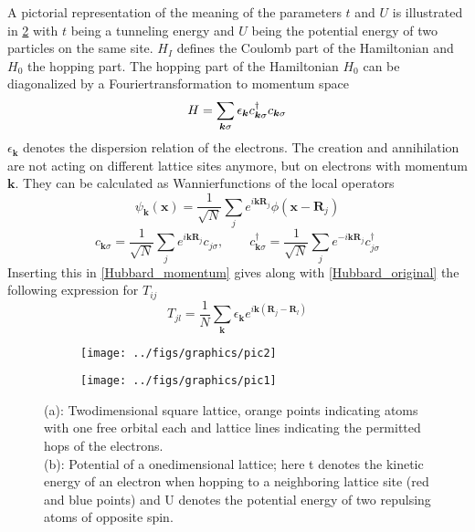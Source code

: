 A pictorial representation of the meaning of the parameters $ t $ and $ U $ is illustrated in \ref{fig:pic1} with $t$ being a tunneling energy and $U$ being the potential energy of two particles on the same site. 
$ H_I $ defines the Coulomb part of the Hamiltonian and $H_0$ the hopping part.
The hopping part of the Hamiltonian $H_0$ can be diagonalized by a Fouriertransformation to momentum space \cite{schoett2014}
\begin{equation}\label{Hubbard_momentum}
H = \sum_{\boldsymbol{k} \sigma} \epsilon_{\boldsymbol{k}} c_{\boldsymbol{k}\sigma}^\dag c_{\boldsymbol{k}\sigma}\\
\end{equation}
$ \epsilon_{\boldsymbol{k}} $ denotes the dispersion relation of the electrons. The creation and annihilation are not acting on different lattice sites anymore, but on electrons with momentum $ \boldsymbol{k} $. They can be calculated as Wannierfunctions of the local operators
\begin{equation}\label{Wannier}
\psi_{\boldsymbol{k}} \left( \boldsymbol{x}\right) = \frac{1}{\sqrt{N}}\sum_{j} e^{i\boldsymbol{k}\boldsymbol{R}_j} \phi(\boldsymbol{x}-\boldsymbol{R}_j)
\end{equation} 
\begin{equation}\label{c_momentum}
c_{\boldsymbol{k}\sigma} = \frac{1}{\sqrt{N}}\sum_{j} e^{i\boldsymbol{k}\boldsymbol{R}_j} c_{j\sigma}, \qquad c_{\boldsymbol{k}\sigma}^\dagger = \frac{1}{\sqrt{N}}\sum_{j} e^{-i\boldsymbol{k}\boldsymbol{R}_j} c_{j\sigma}^\dagger
\end{equation}\cite{Hubbard}  
Inserting this in \eqref{Hubbard_momentum} gives along with \eqref{Hubbard_original} the following expression for $ T_{ij} $ 
\begin{equation}\label{T}
T_{jl} = \frac{1}{N} \sum_{\boldsymbol{k}}\epsilon_{\boldsymbol{k}} e^{i\boldsymbol{k}\left( \boldsymbol{R}_j - \boldsymbol{R}_l\right) }
\end{equation}

\begin{figure}[h!]
	\begin{subfigure}{.5 \textwidth}
		\centering
		\texttt{[image: ../figs/graphics/pic2]}
		\caption{\cite{FigHubbardModel2}}
		\label{fig:pic2}
	\end{subfigure}
	\begin{subfigure}{.5 \textwidth}
		\centering
		\texttt{[image: ../figs/graphics/pic1]}
		\caption{\cite{FigHubbardModel1}}
		\label{fig:pic1}
	\end{subfigure}
\caption[Illustration of the Hubbard model]{(a): Twodimensional square lattice, orange points indicating atoms with one free orbital each and lattice lines indicating the permitted hops of the electrons. \\(b): Potential of a onedimensional lattice; here t denotes the kinetic energy of an electron when hopping to a neighboring lattice site (red and blue points) and U denotes the potential energy of two repulsing atoms of opposite spin.}
\label{HubbardFigs}
\end{figure}


